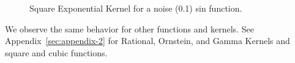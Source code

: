 \documentclass[]{IEEEtran}
\begin{document}
  
\begin{figure}[h]
  \centering
  \hspace{1mm}
  \hspace{1mm}
  \hspace{1mm}
  
  \caption{Square Exponential Kernel for a noise (0.1) sin function.}
  \label{SE_sin_noise}
\end{figure}\par

We observe the same behavior for other functions and kernels. See Appendix~\ref{sec:appendix-2} for Rational, Ornstein, and Gamma Kernels and square and cubic functions.
\end{document}

